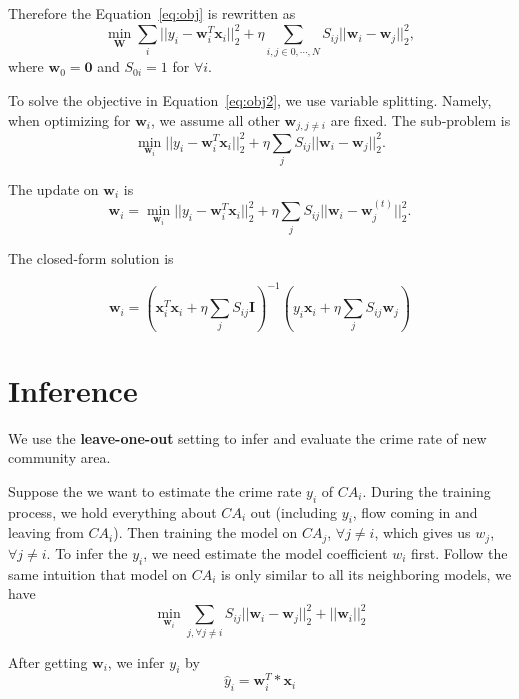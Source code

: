 \documentclass{article}
\begin{document}
Therefore the Equation~\ref{eq:obj} is rewritten as
\begin{equation}
\label{eq:obj2}
\min_{\mathbf{W}}  \sum_i || y_i - \mathbf{w}_i^T \mathbf{x}_i ||_2^2 + \eta \sum_{i,j \in 0, \cdots, N} S_{ij} || \mathbf{w}_i - \mathbf{w}_j ||_2^2,
\end{equation}
where $\mathbf{w}_0 = \mathbf{0}$ and $S_{0i} = 1$ for $\forall i$.


To solve the objective in Equation~\ref{eq:obj2}, we use variable splitting. Namely, when optimizing for $\mathbf{w}_i$, we assume all other $\mathbf{w}_{j, j\neq i}$ are fixed. The sub-problem is
\begin{equation}
\label{eq:subobj}
\min_{\mathbf{w}_i}   ||y_i - \mathbf{w}_i^T \mathbf{x}_i ||_2^2 + \eta \sum_j S_{ij}|| \mathbf{w}_i - \mathbf{w}_j||_2^2.
\end{equation}



The update on $\mathbf{w}_i$ is
\[
\mathbf{w}_i = \min_{\mathbf{w}_i}   ||y_i - \mathbf{w}_i^T \mathbf{x}_i ||_2^2 + \eta \sum_j S_{ij} || \mathbf{w}_i - \mathbf{w}_j^{(t)} ||_2^2.
\]

The closed-form solution is

\begin{equation}
\mathbf{w}_i = (\mathbf{x}_i^T \mathbf{x}_i + \eta \sum_j S_{ij} \mathbf{I} )^{-1} (y_i \mathbf{x}_i + \eta \sum_j S_{ij} \mathbf{w}_j) 
\end{equation}


\section{Inference}

We use the \textbf{leave-one-out} setting to infer and evaluate the crime rate of new community area. 

Suppose the we want to estimate the crime rate $y_i$ of $CA_i$. During the training process, we hold everything about $CA_i$ out (including $y_i$, flow coming in and leaving from $CA_i$). Then training the model on $CA_j$, $\forall j \neq i$, which gives us $w_j$, $\forall j \neq i$. To infer the $y_i$, we need estimate the model coefficient $w_i$ first. Follow the same intuition that model on $CA_i$ is only similar to all its neighboring models, we have
\begin{equation}
\min_{\mathbf{w}_i} \sum_{j, \forall j \neq i} S_{ij} || \mathbf{w}_i - \mathbf{w}_j ||_2^2 + || \mathbf{w}_i ||_2^2
\end{equation}

After getting $\mathbf{w}_i$, we infer $y_i$ by
\begin{equation}
\hat{y}_i = \mathbf{w}_i^T * \mathbf{x}_i
\end{equation}
\end{document}
